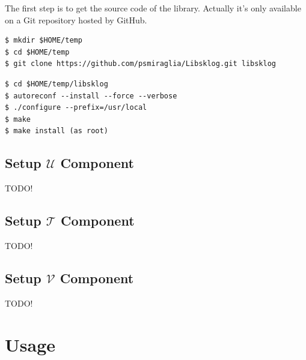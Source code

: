 \documentclass[a4paper,11pt,oneside]{report}
\begin{document}
The first step is to get the source code of the library. Actually it's
only available on a Git repository hosted by GitHub.

\begin{lstlisting}
$ mkdir $HOME/temp
$ cd $HOME/temp
$ git clone https://github.com/psmiraglia/Libsklog.git libsklog
\end{lstlisting}

\begin{lstlisting}
$ cd $HOME/temp/libsklog
$ autoreconf --install --force --verbose
$ ./configure --prefix=/usr/local
$ make
$ make install (as root)
\end{lstlisting}


\section{Setup $\mathcal{U}$ Component}

TODO!


\section{Setup $\mathcal{T}$ Component}

TODO!


\section{Setup $\mathcal{V}$ Component}

TODO!


\chapter{Usage}
\end{document}
